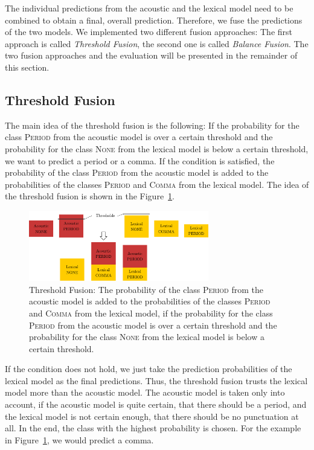 The individual predictions from the acoustic and the lexical model need to be combined to obtain a final, overall prediction.
Therefore, we fuse the predictions of the two models.
We implemented two different fusion approaches:
The first approach is called \emph{Threshold Fusion}, the second one is called \emph{Balance Fusion}.
The two fusion approaches and the evaluation will be presented in the remainder of this section.

\subsection{Threshold Fusion}
The main idea of the threshold fusion is the following: If the probability for the class \textsc{Period} from the acoustic model is over a certain threshold and the probability for the class \textsc{None} from the lexical model is below a certain threshold, we want to predict a period or a comma.
If the condition is satisfied, the probability of the class \textsc{Period} from the acoustic model is added to the probabilities of the classes \textsc{Period} and \textsc{Comma} from the lexical model.
The idea of the threshold fusion is shown in the Figure~\ref{fig:fusion_1}.
\begin{figure}[ht]
    \centering
    \includegraphics[width=0.7\textwidth]{img/fusion_1.pdf}
    \caption{Threshold Fusion: The probability of the class \textsc{Period} from the acoustic model is added to the probabilities of the classes \textsc{Period} and \textsc{Comma} from the lexical model, if the probability for the class \textsc{Period} from the acoustic model is over a certain threshold and the probability for the class \textsc{None} from the lexical model is below a certain threshold.}
    \label{fig:fusion_1}
\end{figure}
If the condition does not hold, we just take the prediction probabilities of the lexical model as the final predictions.
Thus, the threshold fusion trusts the lexical model more than the acoustic model.
The acoustic model is taken only into account, if the acoustic model is quite certain, that there should be a period, and the lexical model is not certain enough, that there should be no punctuation at all.
In the end, the class with the highest probability is chosen.
For the example in Figure~\ref{fig:fusion_1}, we would predict a comma.

